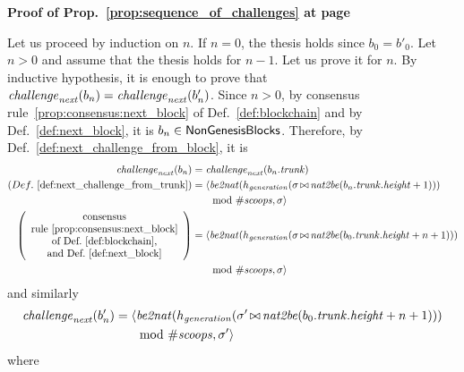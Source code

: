 \noindent
\textbf{Proof of Prop.~\ref{prop:sequence_of_challenges} at page~\pageref{prop:sequence_of_challenges}}

\noindent
  Let us proceed by induction on $n$.
  If $n=0$, the thesis holds since $b_0=b'_0$.
  Let $n>0$ and assume that the thesis holds for $n-1$. Let us prove it for $n$.
  By inductive hypothesis, it is enough
  to prove that ${\mathit{challenge}}_{\mathit{next}}(b_n)={\mathit{challenge}}_{\mathit{next}}(b'_n)$.
  Since $n>0$, by consensus rule~\ref{prop:consensus:next_block} of Def.~\ref{def:blockchain}
  and by Def.~\ref{def:next_block}, it is $b_n\in{\mathsf{NonGenesisBlocks}}$. Therefore, by
  Def.~\ref{def:next_challenge_from_block}, it is
  \begin{align*}
    {\mathit{challenge}}_{\mathit{next}}(b_n)&={\mathit{challenge}}_{\mathit{next}}(b_n.{\mathit{trunk}})\\
    (Def.~\ref{def:next_challenge_from_trunk})&=\langle{\mathit{be2nat}}(h_{\mathit{generation}}(\sigma\operatorname*{\bowtie}{\mathit{nat2be}}(b_n.{\mathit{trunk}}.{\mathit{height}}+1)))\\
    &\qquad\text{mod }{\#\mathit{scoops}},\sigma\rangle\\
    \left(\begin{array}{c}
      \text{consensus}\\
      \text{rule~\ref{prop:consensus:next_block}}\\
      \text{of Def.~\ref{def:blockchain},}\\
      \text{and Def.~\ref{def:next_block}}
    \end{array}\right)&=\langle{\mathit{be2nat}}(h_{\mathit{generation}}(\sigma\operatorname*{\bowtie}{\mathit{nat2be}}(b_0.{\mathit{trunk}}.{\mathit{height}}+n+1)))\\
    &\qquad\text{mod }{\#\mathit{scoops}},\sigma\rangle
  \end{align*}
  and similarly
  \begin{align*}
    {\mathit{challenge}}_{\mathit{next}}(b'_n)&=\langle{\mathit{be2nat}}(h_{\mathit{generation}}(\sigma'\operatorname*{\bowtie}{\mathit{nat2be}}(b_0.{\mathit{trunk}}.{\mathit{height}}+n+1)))\\
    &\qquad\text{mod }{\#\mathit{scoops}},\sigma'\rangle
  \end{align*}
  where
